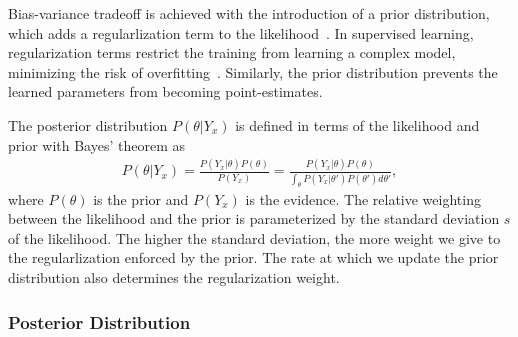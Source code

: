 %
Bias-variance tradeoff is achieved with the introduction of a prior
distribution, which adds a regularlization term to the
likelihood~\cite{bishop2006pattern}.
%
In supervised learning, regularization terms restrict the training from learning
a complex model, minimizing the risk of overfitting~\cite{santos2022avoiding}.
%
Similarly, the prior distribution prevents the learned parameters from becoming
point-estimates.
%


The posterior distribution $P(\theta | Y_x)$ is defined in terms of the likelihood and prior with Bayes' theorem as 
\begin{align}
  P(\theta | Y_x) = \frac{P(Y_x | \theta) P(\theta) }{P(Y_x)}
  = \frac{P(Y_x | \theta) P(\theta) }{\int_\theta P(Y_x | \theta') P(\theta')  d\theta'}, 
  \label{eq:bayes_posterior}
\end{align}
where  $P(\theta)$ is the prior and $P(Y_x)$ is the evidence.
%
The relative weighting between the likelihood and the prior is parameterized by
the standard deviation $s$ of the likelihood. The higher the standard deviation,
the more weight we give to the regularlization enforced by the prior.
%
The rate at which we update the prior distribution also determines the
regularization weight.
%


\subsubsection{Posterior Distribution}

